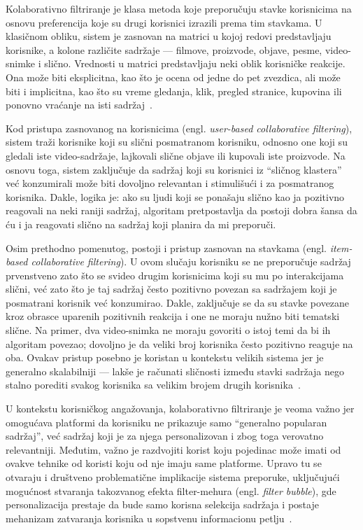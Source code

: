 Kolaborativno filtriranje je klasa metoda koje preporučuju stavke korisnicima na osnovu preferencija koje su drugi korisnici izrazili prema tim stavkama. U klasičnom obliku, sistem je zasnovan na matrici u kojoj redovi predstavljaju korisnike, a kolone različite sadržaje — filmove, proizvode, objave, pesme, video-snimke i slično. Vrednosti u matrici predstavljaju neki oblik korisničke reakcije. Ona može biti eksplicitna, kao što je ocena od jedne do pet zvezdica, ali može biti i implicitna, kao što su vreme gledanja, klik, pregled stranice, kupovina ili ponovno vraćanje na isti sadržaj~\cite{wen2008collaborative}.

Kod pristupa zasnovanog na korisnicima (engl. \textit{user-based collaborative filtering}), sistem traži korisnike koji su slični posmatranom korisniku, odnosno one koji su gledali iste video-sadržaje, lajkovali slične objave ili kupovali iste proizvode. Na osnovu toga, sistem zaključuje da sadržaj koji su korisnici iz “sličnog klastera” već konzumirali može biti dovoljno relevantan i stimulišući i za posmatranog korisnika. Dakle, logika je: ako su ljudi koji se ponašaju slično kao ja pozitivno reagovali na neki raniji sadržaj, algoritam pretpostavlja da postoji dobra šansa da ću i ja reagovati slično na sadržaj koji planira da mi preporuči.

Osim prethodno pomenutog, postoji i pristup zasnovan na stavkama (engl. \textit{item-based collaborative filtering}). U ovom slučaju korisniku se ne preporučuje sadržaj prvenstveno zato što se svideo drugim korisnicima koji su mu po interakcijama slični, već zato što je taj sadržaj često pozitivno povezan sa sadržajem koji je posmatrani korisnik već konzumirao. Dakle, zaključuje se da su stavke povezane kroz obrasce uparenih pozitivnih reakcija i one ne moraju nužno biti tematski slične. Na primer, dva video-snimka ne moraju govoriti o istoj temi da bi ih algoritam povezao; dovoljno je da veliki broj korisnika često pozitivno reaguje na oba. Ovakav pristup posebno je koristan u kontekstu velikih sistema jer je generalno skalabilniji — lakše je računati sličnosti između stavki sadržaja nego stalno porediti svakog korisnika sa velikim brojem drugih korisnika~\cite{wen2008collaborative}.

U kontekstu korisničkog angažovanja, kolaborativno filtriranje je veoma važno jer omogućava platformi da korisniku ne prikazuje samo “generalno popularan sadržaj”, već sadržaj koji je za njega personalizovan i zbog toga verovatno relevantniji. Međutim, važno je razdvojiti korist koju pojedinac može imati od ovakve tehnike od koristi koju od nje imaju same platforme. Upravo tu se otvaraju i društveno problematične implikacije sistema preporuke, uključujući mogućnost stvaranja takozvanog efekta filter-mehura (engl. \textit{filter bubble}), gde personalizacija prestaje da bude samo korisna selekcija sadržaja i postaje mehanizam zatvaranja korisnika u sopstvenu informacionu petlju~\cite{nguyen2014filterbubble}.

